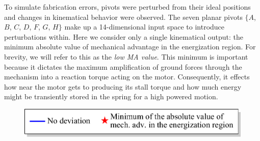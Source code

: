 \documentclass[journal]{IEEEtran}
\begin{document}
To simulate fabrication errors, pivots were perturbed from their ideal positions and changes in kinematical behavior were observed.
The seven planar pivots $\{A$, $B$, $C$, $D$, $F$, $G$, $H\}$ make up a 14-dimensional input space to introduce perturbations within.
Here we consider only a single kinematical output: the minimum absolute value of mechanical advantage in the energization region.  
For brevity, we will refer to this as the \textit{low MA value}.
This minimum is important because it dictates the maximum amplification of ground forces through the mechanism into a reaction torque acting on the motor.
Consequently, it effects how near the motor gets to producing its stall torque and how much energy might be transiently stored in the spring for a high powered motion.


\begin{figure}[t]
	{\centering
		\label{deviatedMAcurves894}}
	\hfil
	\includegraphics[scale=0.4]{deviatedMAcurvesLegend}\\
	{\centering
}
\end{figure}
\end{document}
